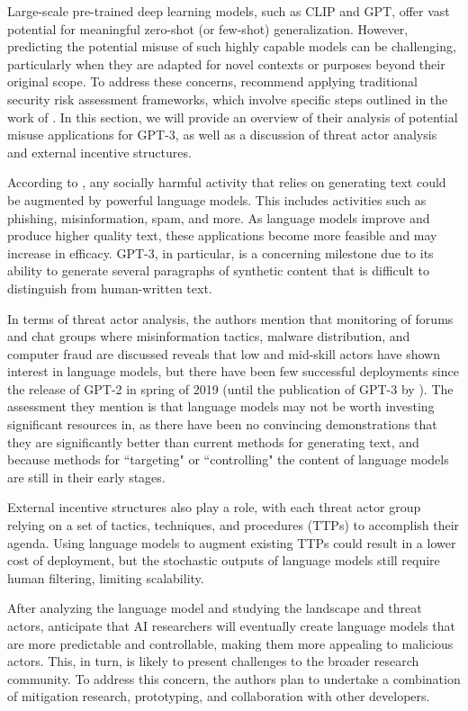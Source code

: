 \documentclass{article}
\begin{document}
Large-scale pre-trained deep learning models, such as CLIP and GPT, offer vast potential for meaningful zero-shot (or few-shot) generalization. However, predicting the potential misuse of such highly capable models can be challenging, particularly when they are adapted for novel contexts or purposes beyond their original scope. To address these concerns, \citet{brown2020gpt3} recommend applying traditional security risk assessment frameworks, which involve specific steps outlined in the work of \citet{ross2012guide}. In this section, we will provide an overview of their analysis of potential misuse applications for GPT-3, as well as a discussion of threat actor analysis and external incentive structures.

\medskip
\noindent
According to \citet{brown2020gpt3}, any socially harmful activity that relies on generating text could be augmented by powerful language models. This includes activities such as phishing, misinformation, spam, and more. As language models improve and produce higher quality text, these applications become more feasible and may increase in efficacy. GPT-3, in particular, is a concerning milestone due to its ability to generate several paragraphs of synthetic content that is difficult to distinguish from human-written text.

\medskip
\noindent
In terms of threat actor analysis, the authors mention that monitoring of forums and chat groups where misinformation tactics, malware distribution, and computer fraud are discussed reveals that low and mid-skill actors have shown interest in language models, but there have been few successful deployments since the release of GPT-2 in spring of 2019 (until the publication of GPT-3 by \citet{brown2020gpt3}). The assessment they mention is that language models may not be worth investing significant resources in, as there have been no convincing demonstrations that they are significantly better than current methods for generating text, and because methods for ``targeting" or ``controlling" the content of language models are still in their early stages.

\medskip
\noindent
External incentive structures also play a role, with each threat actor group relying on a set of tactics, techniques, and procedures (TTPs) to accomplish their agenda. Using language models to augment existing TTPs could result in a lower cost of deployment, but the stochastic outputs of language models still require human filtering, limiting scalability.

\medskip
\noindent
After analyzing the language model and studying the landscape and threat actors, \citet{brown2020gpt3} anticipate that AI researchers will eventually create language models that are more predictable and controllable, making them more appealing to malicious actors. This, in turn, is likely to present challenges to the broader research community. To address this concern, the authors plan to undertake a combination of mitigation research, prototyping, and collaboration with other developers.
\end{document}
